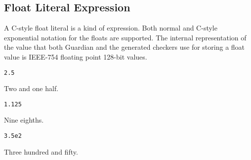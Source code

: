 
\subsection{Float Literal Expression}
{
	A C-style float literal is a kind of expression.
	Both normal and C-style exponential notation for the floats are supported.
	The internal representation of the value that both Guardian and the
	generated checkers use for storing a float value is IEEE-754 floating point
	128-bit values.
	
	\begin{itemize}
	{
		\item[] \lstinline[language=MAIA, columns=fixed]@2.5@
		
			Two and one half.
		
		\item[] \lstinline[language=MAIA, columns=fixed]@1.125@
		
			Nine eighths.
		
		\item[] \lstinline[language=MAIA, columns=fixed]@3.5e2@
		
			Three hundred and fifty.
	}
	\end{itemize}
}
